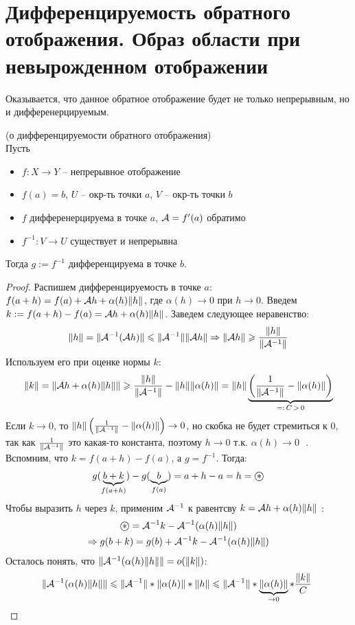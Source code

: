 \section{Дифференцируемость обратного отображения. Образ области при невырожденном отображении}

Оказывается, что данное обратное отображение будет не только непрерывным, но и дифференерцируемым.
\begin{theorem} (о дифференцируемости обратного отображения) \\
    Пусть \begin{itemize}
        \item $f: X \to Y$  -- непрерывное отображение
        \item $f(a) = b$, $U$ -- окр-ть точки $a$, $V$ -- окр-ть точки $b$
        \item $f$ дифференерцируема в точке $a$, $\mathcal{A} = f'(a)$ обратимо
        \item $f^{-1}: V \to U$ существует и непрерывна
    \end{itemize}
    Тогда $g := f^{-1}$ дифференцируема в точке $b$.
\end{theorem}
\begin{proof}
    Распишем дифференцируемость в точке $a$: $f(a + h) = f(a) + \mathcal{A} h + \alpha(h)\| h \|$, где $\alpha(h) \to 0$ при $h \to 0$.
    Введем $k := f(a + h) - f(a) = \mathcal{A} h + \alpha(h)\| h \|$. 
    Заведем следующее неравенство: \[ \| h \| = \| \mathcal{A}^{-1}(\mathcal{A} h) \| \leqslant \| \mathcal{A}^{-1} \| \| \mathcal{A} h \| \Rightarrow \| \mathcal{A} h \| \geqslant \frac{\| h \|}{\| \mathcal{A}^{-1} \|} \]
    \quad Используем его при оценке нормы $k$: \[ \| k \| = \| \mathcal{A} h + \alpha(h)\| h \| \| \geqslant \frac{\| h \|}{\| \mathcal{A}^{-1} \|} - \| h \|\|\alpha(h) \| = \| h \| \underbrace{\left(\frac{1}{\| \mathcal{A}^{-1} \|} - \| \alpha(h) \| \right)}_{=:\, C \, > \, 0} \]
    \quad Если $k \to 0$, то $\| h \| \left(\frac{1}{\| \mathcal{A}^{-1} \|} - \| \alpha(h) \| \right) \to 0$, но скобка не будет стремиться к 0, так как $\frac{1}{\| \mathcal{A}^{-1} \|}$ это какая-то константа, поэтому $h \to 0 \text{ т.к. $\alpha(h) \to 0$ }$.
    Вспомним, что $k = f(a+h) - f(a)$, а $g = f^{-1}$. 
    \quad Тогда: \begin{gather*}
        g(\underbrace{b + k}_{f(a+h)}) - g(\underbrace{b}_{f(a)}) = a + h - a = h = \oast 
    \end{gather*}
    \quad Чтобы выразить $h$ через $k$, применим $\mathcal{A}^{-1}$ к равентсву $k = \mathcal{A} h + \alpha(h)\| h \|$ : \begin{gather*}
        \oast = \A^{-1}k - \A^{-1}(\alpha(h) \| h \|) \\
        \Rightarrow g(b + k) = g(b) + \A^{-1}k - \A^{-1}(\alpha(h) \| h \|)
    \end{gather*}
    \quad Осталось понять, что $\| \mathcal{A}^{-1}(\alpha(h) \| h \| \| = o(\|k\|)$:
    \[ \| \mathcal{A}^{-1}(\alpha(h) \| h \| \| \leqslant \| \mathcal{A}^{-1} \| * \|\alpha(h) \| * \| h \| \leqslant \| \mathcal{A}^{-1} \| * \underbrace{\|\alpha(h) \|}_{\to 0} * \frac{\|k\|}{C}\  \]
\end{proof}

